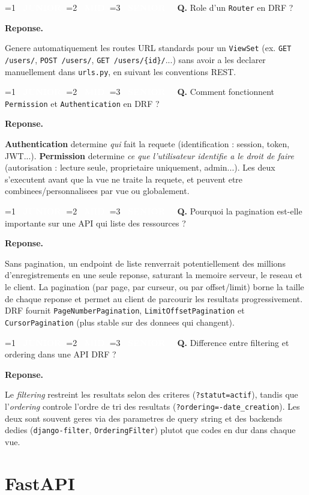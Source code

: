 \documentclass[11pt,a4paper]{article}
\newcommand{\badgeJ}{\textcolor{white}{\colorbox{junior}{\small\bfseries\ JUNIOR\ }}}
\newcommand{\badgeM}{\textcolor{white}{\colorbox{mid}{\small\bfseries\ MID\ }}}
\newcommand{\badgeS}{\textcolor{white}{\colorbox{senior}{\small\bfseries\ SENIOR\ }}}
\newcounter{qcount}
\newenvironment{qa}[2]{%
  \stepcounter{qcount}%
  \par\vspace{6pt}%
  \noindent\colorbox{qbg}{\parbox{\dimexpr\linewidth-12pt}{\vspace{2pt}%
  \ifnum#1=1 \badgeJ\fi\ifnum#1=2 \badgeM\fi\ifnum#1=3 \badgeS\fi
  \ \textbf{Q\theqcount.} #2\vspace{2pt}}}\par\vspace{4pt}%
  \noindent\textbf{\color{accent}Reponse.}\ \ignorespaces
}{%
  \par\vspace{8pt}%
}
\begin{document}
\begin{qa}{2}{Role d'un \texttt{Router} en DRF ?}
Genere automatiquement les routes URL standards pour un \texttt{ViewSet} (ex.
\texttt{GET /users/}, \texttt{POST /users/}, \texttt{GET /users/\{id\}/}...)
sans avoir a les declarer manuellement dans \texttt{urls.py}, en suivant les
conventions REST.
\end{qa}

\begin{qa}{1}{Comment fonctionnent \texttt{Permission} et \texttt{Authentication} en DRF ?}
\textbf{Authentication} determine \emph{qui} fait la requete (identification :
session, token, JWT...). \textbf{Permission} determine \emph{ce que
l'utilisateur identifie a le droit de faire} (autorisation : lecture seule,
proprietaire uniquement, admin...). Les deux s'executent avant que la vue ne
traite la requete, et peuvent etre combinees/personnalisees par vue ou
globalement.
\end{qa}

\begin{qa}{2}{Pourquoi la pagination est-elle importante sur une API qui liste des ressources ?}
Sans pagination, un endpoint de liste renverrait potentiellement des millions
d'enregistrements en une seule reponse, saturant la memoire serveur, le
reseau et le client. La pagination (par page, par curseur, ou par
offset/limit) borne la taille de chaque reponse et permet au client de
parcourir les resultats progressivement. DRF fournit
\texttt{PageNumberPagination}, \texttt{LimitOffsetPagination} et
\texttt{CursorPagination} (plus stable sur des donnees qui changent).
\end{qa}

\begin{qa}{2}{Difference entre filtering et ordering dans une API DRF ?}
Le \emph{filtering} restreint les resultats selon des criteres
(\texttt{?statut=actif}), tandis que l'\emph{ordering} controle l'ordre de
tri des resultats (\texttt{?ordering=-date\_creation}). Les deux sont souvent
geres via des parametres de query string et des backends dedies
(\texttt{django-filter}, \texttt{OrderingFilter}) plutot que codes en dur dans
chaque vue.
\end{qa}

\newpage
\section{FastAPI}
\end{document}
